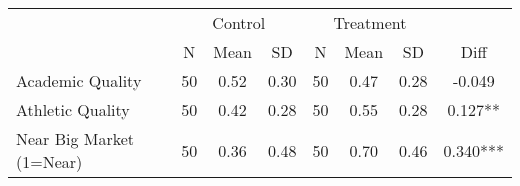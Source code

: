 \begin{tabular}{lccccccc}
\hline  & \multicolumn{3}{c}{Control} & \multicolumn{3}{c}{Treatment} & \\
 & N & Mean & SD & N & Mean & SD & Diff\\
\hline Academic Quality & 50 & 0.52 & 0.30 & 50 & 0.47 & 0.28 & -0.049\\
Athletic Quality & 50 & 0.42 & 0.28 & 50 & 0.55 & 0.28 & 0.127**\\
Near Big Market (1=Near) & 50 & 0.36 & 0.48 & 50 & 0.70 & 0.46 & 0.340***\\
\hline\end{tabular}\\
\hfil\\
